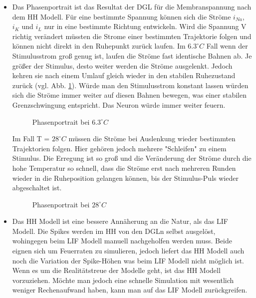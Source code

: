\documentclass[conference]{IEEEtran}
\begin{document}
\begin{itemize}
\item Das Phasenportrait ist das Resultat der DGL für die Membranspannung nach dem HH Modell. Für eine bestimmte Spannung können sich die Ströme $i_{Na}$, $i_K$ und $i_L$ nur in eine bestimmte Richtung entwickeln. Wird die Spannung V richtig verändert müssten die Strome einer bestimmten Trajektorie folgen und können nicht direkt in den Ruhepunkt zurück laufen. Im $6.3^\circ C$ Fall wenn der Stimulusstrom groß genug ist, laufen die Ströme fast identische Bahnen ab. Je größer der Stimulus, desto weiter werden die Ströme ausgelenkt. Jedoch kehren sie nach einem Umlauf gleich wieder in den stabilen Ruhezustand zurück (vgl. Abb. \ref{fig:Phasenportrait6}). Würde man den Stimulusstrom konstant lassen würden sich die Ströme immer weiter auf diesen Bahnen bewegen, was einer stabilen Grenzschwingung entspricht. Das Neuron würde immer weiter feuern.\\
\begin{figure}[h!]
  	\centering
    \scalebox{.6}{}
    \caption{Phasenportrait bei $6.3^\circ C$}
    \label{fig:Phasenportrait6}
\end{figure}
Im Fall T = $28^\circ C$ müssen die Ströme bei Auslenkung wieder bestimmten Trajektorien folgen. Hier gehören jedoch mehrere "Schleifen" zu einem Stimulus. Die Erregung ist so groß und die Veränderung der Ströme durch die hohe Temperatur so schnell, dass die Ströme erst nach mehreren Runden wieder in die Ruheposition gelangen können, bis der Stimulus-Puls wieder abgeschaltet ist. 
\begin{figure}[h!]
  	\centering
    \scalebox{.6}{}
    \caption{Phasenportrait bei $28^\circ C$}
    \label{fig:Phasenportrait28}
\end{figure}



\item Das HH Modell ist eine bessere Annäherung an die Natur, als das LIF Modell. Die Spikes werden im HH von den DGLn selbst ausgelöst, wohingegen beim LIF Modell manuell nachgeholfen werden muss. Beide eignen sich um Feuerraten zu simulieren, jedoch liefert das HH Modell auch noch die Variation der Spike-Höhen was beim LIF Modell nicht möglich ist. Wenn es um die Realitätstreue der Modelle geht, ist das HH Modell vorzuziehen. Möchte man jedoch eine schnelle Simulation mit wesentlich weniger Rechenaufwand haben, kann man auf das LIF Modell zurückgreifen.
\end{itemize}
\end{document}
